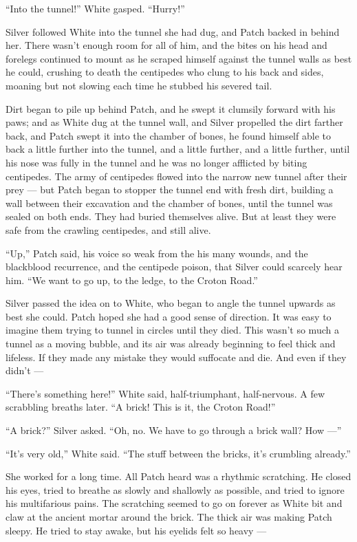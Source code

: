 \documentclass[ebook,oneside,openany,12pt]{memoir}
\begin{document}
“Into the tunnel!” White gasped. “Hurry!”

Silver followed White into the tunnel she had dug, and Patch backed in
behind her. There wasn’t enough room for all of him, and the bites on
his head and forelegs continued to mount as he scraped himself against
the tunnel walls as best he could, crushing to death the centipedes
who clung to his back and sides, moaning but not slowing each time he
stubbed his severed tail.

Dirt began to pile up behind Patch, and he swept it clumsily forward
with his paws; and as White dug at the tunnel wall, and Silver
propelled the dirt farther back, and Patch swept it into the chamber
of bones, he found himself able to back a little further into the
tunnel, and a little further, and a little further, until his nose was
fully in the tunnel and he was no longer afflicted by biting
centipedes. The army of centipedes flowed into the narrow new tunnel
after their prey — but Patch began to stopper the tunnel end with
fresh dirt, building a wall between their excavation and the chamber
of bones, until the tunnel was sealed on both ends. They had buried
themselves alive. But at least they were safe from the crawling
centipedes, and still alive.

“Up,” Patch said, his voice so weak from the his many wounds, and the
blackblood recurrence, and the centipede poison, that Silver could
scarcely hear him. “We want to go up, to the ledge, to the Croton
Road.”

Silver passed the idea on to White, who began to angle the tunnel
upwards as best she could. Patch hoped she had a good sense of
direction. It was easy to imagine them trying to tunnel in circles
until they died. This wasn’t so much a tunnel as a moving bubble, and
its air was already beginning to feel thick and lifeless. If they made
any mistake they would suffocate and die. And even if they didn’t —

“There’s something here!” White said, half-triumphant, half-nervous. A
few scrabbling breaths later. “A brick! This is it, the Croton Road!”

“A brick?” Silver asked. “Oh, no. We have to go through a brick wall?
How —”

“It’s very old,” White said. “The stuff between the bricks, it’s
crumbling already.”

She worked for a long time. All Patch heard was a rhythmic
scratching. He closed his eyes, tried to breathe as slowly and
shallowly as possible, and tried to ignore his multifarious pains. The
scratching seemed to go on forever as White bit and claw at the
ancient mortar around the brick. The thick air was making Patch
sleepy. He tried to stay awake, but his eyelids felt so heavy —
\end{document}
